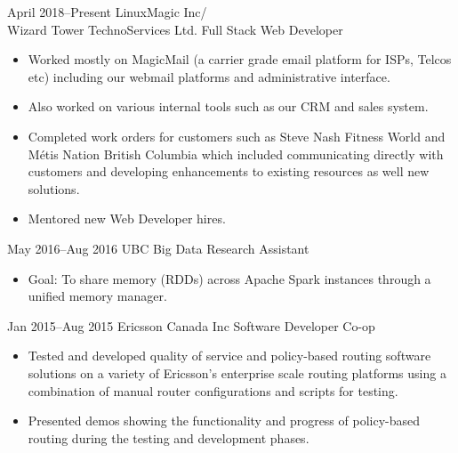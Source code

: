 \documentclass[]{friggeri-cv} %
\begin{document}
\begin{entrylist}

\entryFirstPage
{April 2018--Present}
{LinuxMagic Inc/\\
 Wizard Tower TechnoServices Ltd. {\normalfont Full Stack Web Developer}}
{
\begin{itemize}
  \item Worked mostly on MagicMail (a carrier grade email platform for ISPs,
    Telcos etc) including our webmail platforms and administrative interface.
  \item Also worked on various internal tools such as our CRM and sales
    system.
  \item Completed work orders for customers such as Steve Nash Fitness World and
    Métis Nation British Columbia which included communicating directly with
    customers and developing enhancements to existing resources as well new
    solutions.
  \item Mentored new Web Developer hires.\\
\end{itemize}
}
\entryFirstPage
{May 2016--Aug 2016}
{UBC {\normalfont Big Data Research Assistant}}
{
\begin{itemize}
\item Goal: To share memory (RDDs) across Apache Spark instances through a
unified memory manager.\\
\end{itemize}
}
\entryFirstPage
{Jan 2015--Aug 2015}
{Ericsson Canada Inc {\normalfont Software Developer Co-op}}
{
\begin{itemize}
\item Tested and developed quality of service and policy-based routing software
solutions on a variety of Ericsson's enterprise scale routing platforms using a
combination of manual router configurations and scripts for testing.
\item Presented demos showing the functionality and progress of policy-based
routing during the testing and development phases.\\
\end{itemize}
}
\end{entrylist}
\end{document}
